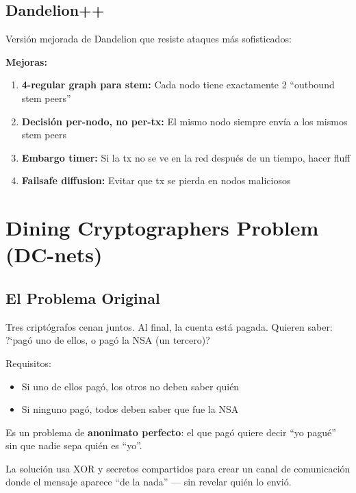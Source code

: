 \documentclass[11pt,a4paper,twoside]{book}
\begin{document}
\subsection{Dandelion++}

\begin{definition}[Dandelion++]
Versi\'on mejorada de Dandelion que resiste ataques m\'as sofisticados:

\textbf{Mejoras:}
\begin{enumerate}
    \item \textbf{4-regular graph para stem:} Cada nodo tiene exactamente 2 ``outbound stem peers''
    \item \textbf{Decisi\'on per-nodo, no per-tx:} El mismo nodo siempre env\'ia a los mismos stem peers
    \item \textbf{Embargo timer:} Si la tx no se ve en la red despu\'es de un tiempo, hacer fluff
    \item \textbf{Failsafe diffusion:} Evitar que tx se pierda en nodos maliciosos
\end{enumerate}
\end{definition}

\section{Dining Cryptographers Problem (DC-nets)}
\label{sec:dcnets}

\subsection{El Problema Original}

\begin{definition}
Tres cript\'ografos cenan juntos. Al final, la cuenta est\'a pagada. Quieren saber: ?`pag\'o uno de ellos, o pag\'o la NSA (un tercero)?

Requisitos:
\begin{itemize}
    \item Si uno de ellos pag\'o, los otros no deben saber qui\'en
    \item Si ninguno pag\'o, todos deben saber que fue la NSA
\end{itemize}
\end{definition}

\begin{intuicion}
Es un problema de \textbf{anonimato perfecto}: el que pag\'o quiere decir ``yo pagu\'e'' sin que nadie sepa qui\'en es ``yo''.

La soluci\'on usa XOR y secretos compartidos para crear un canal de comunicaci\'on donde el mensaje aparece ``de la nada'' --- sin revelar qui\'en lo envi\'o.
\end{intuicion}
\end{document}
